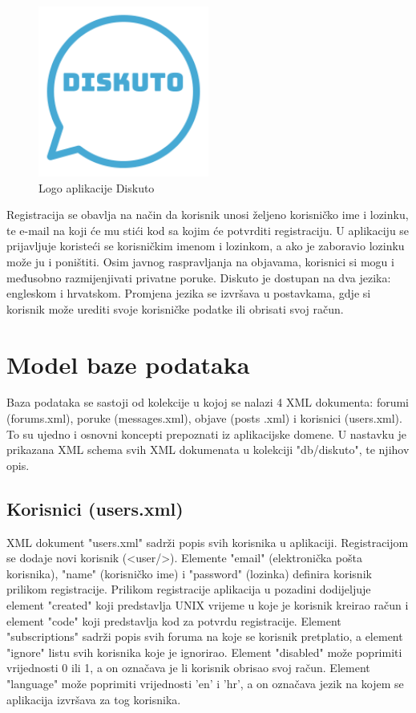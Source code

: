 \documentclass{foi}
\begin{document}
\begin{figure}[h!]
    \centering
    \includegraphics[width=0.5\textwidth]{slike/logo.png}
    \caption{Logo aplikacije Diskuto}
\end{figure}

Registracija se obavlja na način da korisnik unosi željeno korisničko ime i lozinku, te e-mail na koji će mu stići kod sa kojim će potvrditi registraciju. U aplikaciju se prijavljuje koristeći se korisničkim imenom i lozinkom, a ako je zaboravio lozinku može ju i poništiti. Osim javnog raspravljanja na objavama, korisnici si mogu i međusobno razmijenjivati privatne poruke. Diskuto je dostupan na dva jezika: engleskom i hrvatskom. Promjena jezika se izvršava u postavkama, gdje si korisnik može urediti svoje korisničke podatke ili obrisati svoj račun.

\chapter{Model baze podataka}

Baza podataka se sastoji od kolekcije u kojoj se nalazi 4 XML dokumenta: forumi (forums.xml), poruke (messages.xml), objave (posts .xml) i korisnici (users.xml). To su ujedno i osnovni koncepti prepoznati iz aplikacijske domene. U nastavku je prikazana XML schema svih XML dokumenata u kolekciji "db/diskuto", te njihov opis.

\section{Korisnici (users.xml)}

XML dokument "users.xml" sadrži popis svih korisnika u aplikaciji. Registracijom se dodaje novi korisnik (<user/>). Elemente "email" (elektronička pošta korisnika), "name" (korisničko ime) i "password" (lozinka) definira korisnik prilikom registracije. Prilikom registracije aplikacija u pozadini dodijeljuje element "created" koji predstavlja UNIX vrijeme u koje je korisnik kreirao račun i element "code" koji predstavlja kod za potvrdu registracije. Element "subscriptions" sadrži popis svih foruma na koje se korisnik pretplatio, a element "ignore" listu svih korisnika koje je ignorirao. Element "disabled" može poprimiti vrijednosti 0 ili 1, a on označava je li korisnik obrisao svoj račun. Element "language" može poprimiti vrijednosti 'en' i 'hr', a on označava jezik na kojem se aplikacija izvršava za tog korisnika.
\end{document}
